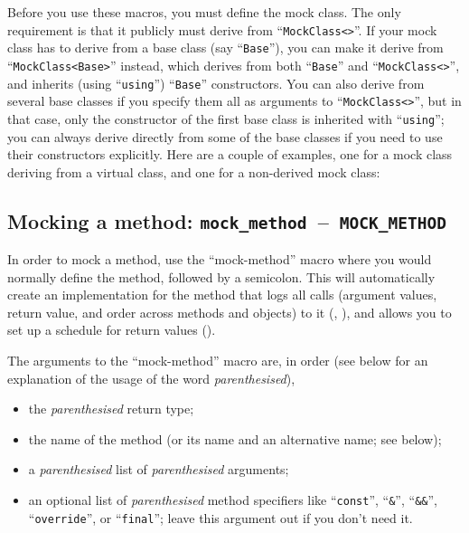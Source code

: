 \documentclass[twoside, a4paper, article]{memoir}
\newcommand*\testudocolor{\color{red!80!blue}}
\newcommand*\testudo[1]{\texttt{\testudocolor{}#1}}
\newcommand*\testudopair[2]{\testudo{#1}~--~\testudo{#2}}
\newcommand\subsectiontestudopair[3]{%
  \subsection[#1]{#1: \testudopair{#2}{#3}}}
\providecommand\typesetexample[1]{%
}
\begin{document}
Before you use these macros, you must define the mock class.  The only
requirement is that it publicly must derive from ``\texttt{MockClass<>}''.  If
your mock class has to derive from a base class (say ``\texttt{Base}''), you
can make it derive from ``\texttt{MockClass<Base>}'' instead, which derives
from both ``\texttt{Base}'' and ``\texttt{MockClass<>}'', and inherits (using
``\texttt{using}'') ``\texttt{Base}'' constructors.  You can also derive from
several base classes if you specify them all as arguments to
``\texttt{MockClass<>}'', but in that case, only the constructor of the first
base class is inherited with ``\texttt{using}''; you can always derive directly
from some of the base classes if you need to use their constructors explicitly.
Here are a couple of examples, one for a mock class deriving from a virtual
class, and one for a non-derived mock class:

\typesetexample{mock-class}

\subsectiontestudopair{Mocking a method}{mock\_method}{MOCK\_METHOD}
\label{sec:mocking-method}

In order to mock a method, use the ``mock-method'' macro where you would
normally define the method, followed by a semicolon.  This will automatically
create an implementation for the method that logs all calls (argument values,
return value, and order across methods and objects) to it
(, ), and
allows you to set up a schedule for return values
().

The arguments to the ``mock-method'' macro are, in order (see below for an
explanation of the usage of the word \emph{parenthesised}),
\begin{itemize}
\item the \emph{parenthesised} return type;
\item the name of the method (or its name and an alternative name; see below);
\item a \emph{parenthesised} list of \emph{parenthesised} arguments;
\item an optional list of \emph{parenthesised} method specifiers like
  ``\texttt{const}'', ``\texttt{\&}'', ``\texttt{\&\&}'', ``\texttt{override}'', or ``\texttt{final}''; leave this
  argument out if you don't need it.
\end{itemize}
\end{document}
